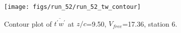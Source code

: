 \begin{figure}[H]
\centering
\texttt{[image: figs/run\_52/run\_52\_tw\_contour]}
\caption{Contour plot of $\overline{t^\prime w^\prime}$ at $z/c$=9.50, $V_{free}$=17.36, station 6.}
\label{fig:run_52_tw_contour}
\end{figure}


